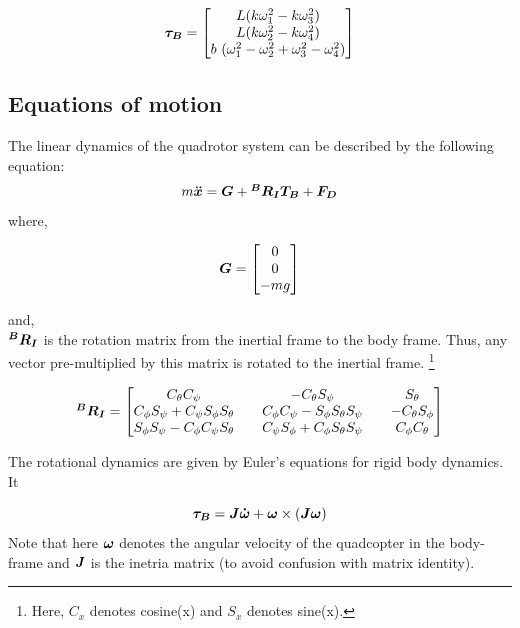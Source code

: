 \documentclass[12pt,fleqn]{article}
\newcommand{\mbm}[1]{\mbox{\boldmath $#1$}}
\begin{document}
\begin{equation} \label{tauvector} 
$$ \mbm{\tau_B} = \begin{bmatrix} L (k\omega_1^2 - k\omega_3^2)\\ L
  (k\omega_2^2 - k\omega_4^2) \\ b\ (\omega_1^2 - \omega_2^2 + \omega_3^2 -
\omega_4^2) \end{bmatrix} $$
\end{equation}

\subsection{Equations of motion}

The linear dynamics of the quadrotor system can be described by the
following equation:
\begin{equation} \label{eom_linear}
$$ m \mbm{\ddot{x}} = \mbm{G} + \mbm{^BR_IT_{B}} + \mbm{F_{D}} $$
\end{equation}
where, 

$$ \mbm{G} = \begin{bmatrix} 0 \\ 0 \\ -mg \end{bmatrix} $$

and,\\ 

$ \mbm{^BR_I} $ is the rotation matrix from the inertial frame to the
body frame. Thus, any vector pre-multiplied by this matrix is
rotated to the inertial frame. \footnote{Here, $C_x$ denotes cosine(x) and $S_x$ denotes sine(x).}

\begin{equation} \label{rotation_matrix}
$$ \mbm{^BR_I} = \begin{bmatrix} C_\theta C_\psi && -C_\theta S_\psi && S_\theta\\
C_\phi S_\psi + C_\psi S_\phi S_\theta&& C_\phi C_\psi - S_\phi
S_\theta S_\psi&& -C_\theta S_\phi\\
S_\phi S_\psi - C_\phi C_\psi S_\theta&&
C_\psi S_\phi + C_\phi S_\theta S_\psi&&
C_\phi C_\theta \end{bmatrix} $$
\\
\end{equation}

The rotational dynamics are given by Euler's equations for rigid body
dynamics. It

\begin{equation} \label{eom_rotational}
\mbm{\tau_B} = \mbm{J\dot{\omega}} + \mbm{\omega} \times (\mbm{J\omega})
\end{equation}
Note that here $\mbm{\omega}$ denotes the angular velocity of the
quadcopter in the body-frame and $\mbm{J}$ is the inetria matrix (to
avoid confusion with matrix identity).\\
\end{document}
